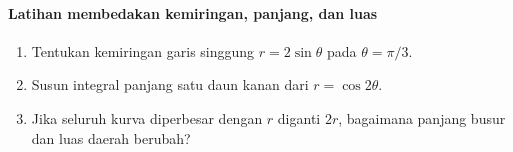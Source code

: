 \documentclass{../../kalkulus-ppt}
\begin{document}
\begin{frame}{\insertsection}
    \framesubtitle{Latihan membedakan kemiringan, panjang, dan luas}
    \begin{latihan}
        \begin{enumerate}
            \item Tentukan kemiringan garis singgung $r=2\sin\theta$
                pada $\theta=\pi/3$.
            \item Susun integral panjang satu daun kanan dari $r=\cos2\theta$.
            \item Jika seluruh kurva diperbesar dengan $r$ diganti $2r$,
                bagaimana panjang busur dan luas daerah berubah?
        \end{enumerate}
    \end{latihan}
\end{frame}
\end{document}
